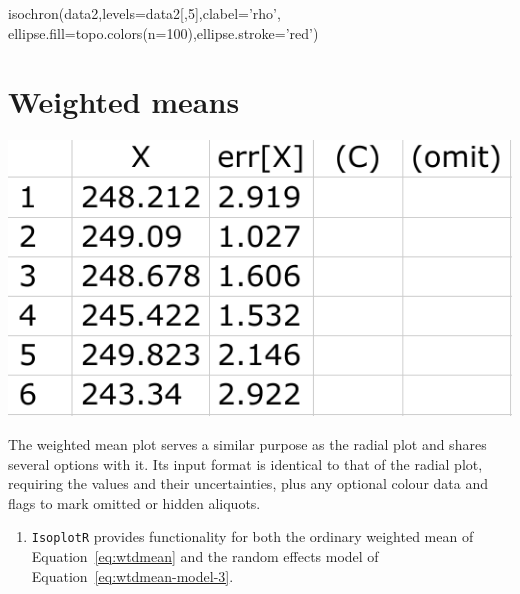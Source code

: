 \begin{refsection}
\begin{enumerate}
\begin{script}
isochron(data2,levels=data2[,5],clabel='rho',
         ellipse.fill=topo.colors(n=100),ellipse.stroke='red')
\end{script}
  
\end{enumerate}

\section{Weighted means}\label{sec:OtherWeightedMean}

\noindent\begin{minipage}[t]{.32\linewidth}
  \strut\vspace*{-\baselineskip}\newline
  \includegraphics[width=\linewidth]{../figures/OtherWtdMeanData.png}
\end{minipage}
\begin{minipage}[t]{.68\linewidth}
The weighted mean plot serves a similar purpose as the radial plot and
shares several options with it. Its input format is identical to that
of the radial plot, requiring the values and their uncertainties, plus
any optional colour data and flags to mark omitted or hidden aliquots.
\end{minipage}

\begin{enumerate}

\item \texttt{IsoplotR} provides functionality for both the ordinary
  weighted mean of Equation~\ref{eq:wtdmean} and the random effects
  model of Equation~\ref{eq:wtdmean-model-3}.


\end{enumerate}
\end{refsection}
